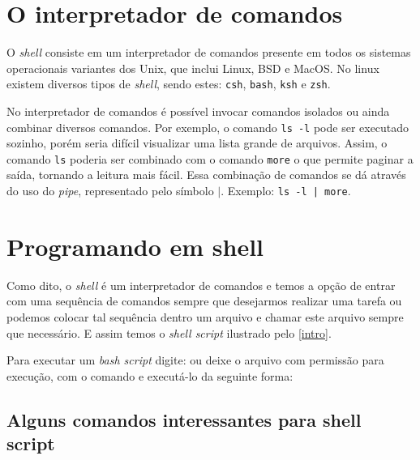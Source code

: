 \documentclass[11pt]{../classes/ifscarticle}
\begin{document}

\shell

\section{O interpretador de comandos}

O \textit{shell} consiste em um interpretador de comandos presente em todos os sistemas operacionais variantes dos Unix, que inclui Linux, BSD e MacOS. No linux existem diversos tipos de \textit{shell}, sendo estes: \texttt{csh}, \texttt{bash}, \texttt{ksh} e \texttt{zsh}. 

No interpretador de comandos é possível invocar comandos isolados ou ainda combinar diversos comandos. Por exemplo, o comando \texttt{ls -l} pode ser executado sozinho, porém seria difícil visualizar uma lista grande de arquivos. Assim, o comando \texttt{ls} poderia ser combinado com o comando \texttt{more} o que permite paginar a saída, tornando a leitura mais fácil. Essa combinação de comandos se dá através do uso do \textit{pipe}, representado pelo símbolo $|$. Exemplo: \texttt{ls -l | more}.

\section{Programando em shell}

Como dito, o \textit{shell} é um interpretador de comandos e temos a opção de entrar com uma sequência de comandos sempre que desejarmos realizar uma tarefa ou podemos colocar tal sequência dentro um arquivo e chamar este arquivo sempre que necessário. E assim temos o \textit{shell script} ilustrado pelo \autoref{intro}.


\begin{informacao}
	Para executar um \textit{bash script} digite:  ou deixe o arquivo com permissão para execução, com o comando  e executá-lo da seguinte forma: 
\end{informacao}

\subsection{Alguns comandos interessantes para shell script}
\end{document}
